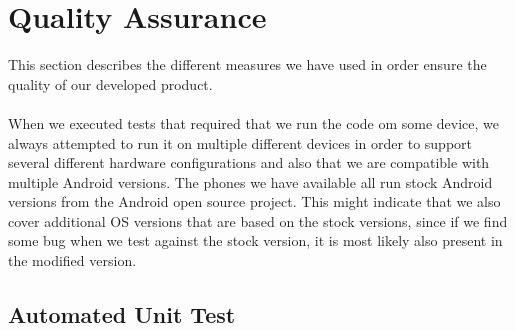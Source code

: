 
\chapter{Quality Assurance}
\label{cha:quality_assurance}

This section describes the different measures we have used in order ensure the quality of our developed product.
\\\\ 
When we executed tests that required that we run the code om some device, we always attempted to run it on multiple different devices in order to support several different hardware configurations and also that we are compatible with multiple Android versions. The phones we have available all run stock Android versions from the Android open source project. This might indicate that we also cover additional OS versions that are based on the stock versions, since if we find some bug when we test against the stock version, it is most likely also present in the modified version. 



\section{Automated Unit Test}
\label{sec:automated_unit_test}


